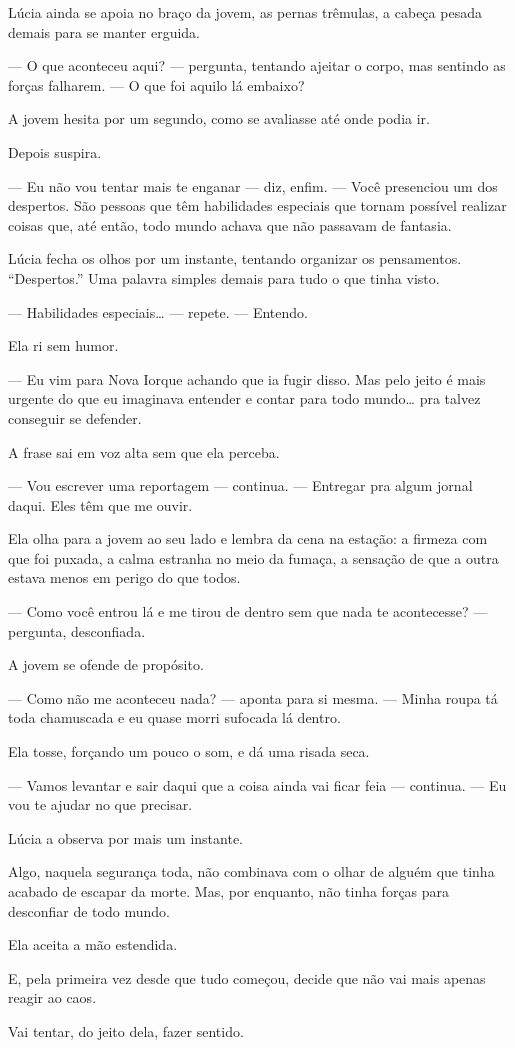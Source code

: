 Lúcia ainda se apoia no braço da jovem, as pernas trêmulas, a cabeça pesada demais para se manter erguida.

— O que aconteceu aqui? — pergunta, tentando ajeitar o corpo, mas sentindo as forças falharem. — O que foi aquilo lá embaixo?

A jovem hesita por um segundo, como se avaliasse até onde podia ir.

Depois suspira.

— Eu não vou tentar mais te enganar — diz, enfim. — Você presenciou um dos despertos.  
São pessoas que têm habilidades especiais que tornam possível realizar coisas que, até então, todo mundo achava que não passavam de fantasia.

Lúcia fecha os olhos por um instante, tentando organizar os pensamentos.  
“Despertos.”  
Uma palavra simples demais para tudo o que tinha visto.

— Habilidades especiais… — repete. — Entendo.

Ela ri sem humor.

— Eu vim para Nova Iorque achando que ia fugir disso.  
Mas pelo jeito é mais urgente do que eu imaginava entender e contar para todo mundo…  
pra talvez conseguir se defender.

A frase sai em voz alta sem que ela perceba.

— Vou escrever uma reportagem — continua. — Entregar pra algum jornal daqui. Eles têm que me ouvir.

Ela olha para a jovem ao seu lado e lembra da cena na estação: a firmeza com que foi puxada, a calma estranha no meio da fumaça, a sensação de que a outra estava menos em perigo do que todos.

— Como você entrou lá e me tirou de dentro sem que nada te acontecesse? — pergunta, desconfiada.

A jovem se ofende de propósito.

— Como não me aconteceu nada? — aponta para si mesma. — Minha roupa tá toda chamuscada e eu quase morri sufocada lá dentro.

Ela tosse, forçando um pouco o som, e dá uma risada seca.

— Vamos levantar e sair daqui que a coisa ainda vai ficar feia — continua. — Eu vou te ajudar no que precisar.

Lúcia a observa por mais um instante.

Algo, naquela segurança toda, não combinava com o olhar de alguém que tinha acabado de escapar da morte.  
Mas, por enquanto, não tinha forças para desconfiar de todo mundo.

Ela aceita a mão estendida.

E, pela primeira vez desde que tudo começou, decide que não vai mais apenas reagir ao caos.

Vai tentar, do jeito dela, fazer sentido.
